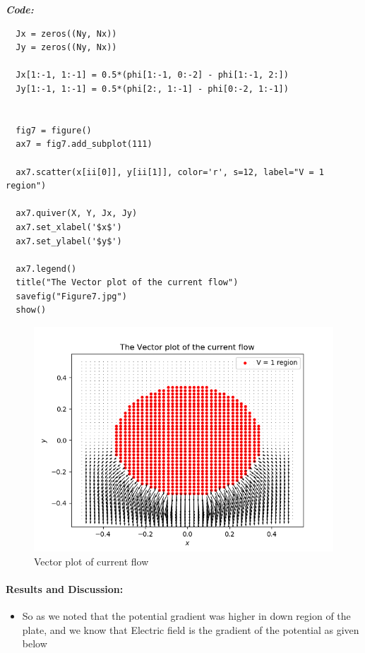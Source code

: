 \documentclass[11pt, a4paper]{article}
\begin{document}
  \textit{\textbf{Code:}}
\begin{lstlisting}
  Jx = zeros((Ny, Nx))
  Jy = zeros((Ny, Nx))
  
  Jx[1:-1, 1:-1] = 0.5*(phi[1:-1, 0:-2] - phi[1:-1, 2:])
  Jy[1:-1, 1:-1] = 0.5*(phi[2:, 1:-1] - phi[0:-2, 1:-1])
  
  
  fig7 = figure()
  ax7 = fig7.add_subplot(111)
  
  ax7.scatter(x[ii[0]], y[ii[1]], color='r', s=12, label="V = 1 region")
  
  ax7.quiver(X, Y, Jx, Jy)
  ax7.set_xlabel('$x$')
  ax7.set_ylabel('$y$')
  
  ax7.legend()
  title("The Vector plot of the current flow")
  savefig("Figure7.jpg")
  show()

  \end{lstlisting}
  \newpage
  \begin{figure}[!tbh]
   \centering
   \includegraphics[scale=0.8]{./../Extras/Figure_7.png}  
   \caption{Vector plot of current flow}
  \end{figure}

  \newpage
  \paragraph{Results and Discussion:}\label{results-and-discussion}

  \begin{itemize}
  \item
    So as we noted that the potential gradient was higher in down region
    of the plate, and we know that Electric field is the gradient of the
    potential as given below
  \end{itemize}
  
\end{document}
